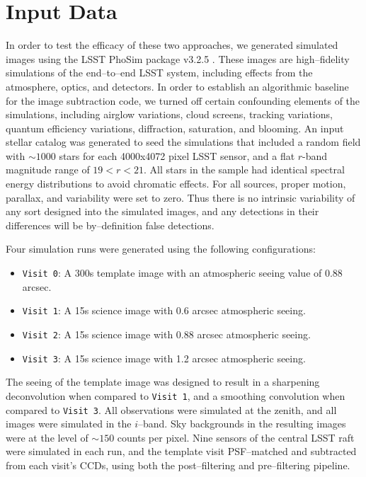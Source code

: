 \documentclass[iop]{emulateapj}
\begin{document}

\section{Input Data}

In order to test the efficacy of these two approaches, we generated simulated images using the LSST PhoSim package v3.2.5 \citep{phosim}.
These images are high--fidelity simulations of the end--to--end LSST system, including effects from the atmosphere, optics, and detectors.
In order to establish an algorithmic baseline for the image subtraction code, we turned off certain confounding elements of the simulations, including airglow variations, cloud screens, tracking variations, quantum efficiency variations, diffraction, saturation, and blooming.
An input stellar catalog was generated to seed the simulations that included a random field with $\sim 1000$ stars for each 4000x4072 pixel LSST sensor, and a flat $r$-band magnitude range of $19<r<21$.
All stars in the sample had identical spectral energy distributions to avoid chromatic effects.
For all sources, proper motion, parallax, and variability were set to zero.
Thus there is no intrinsic variability of any sort designed into the simulated images, and any detections in their differences will be by--definition false detections.

Four simulation runs were generated using the following configurations:
\begin{itemize}
\item {\tt Visit 0}: A 300s template image with an atmospheric seeing value of 0.88 arcsec.
\item {\tt Visit 1}: A 15s science image with 0.6 arcsec atmospheric seeing.
\item {\tt Visit 2}: A 15s science image with 0.88 arcsec atmospheric seeing.
\item {\tt Visit 3}: A 15s science image with 1.2 arcsec atmospheric seeing.
\end{itemize}
The seeing of the template image was designed to result in a sharpening deconvolution when compared to {\tt Visit 1}, and a smoothing convolution when compared to {\tt Visit 3}.
All observations were simulated at the zenith, and all images were simulated in the $i$--band.
Sky backgrounds in the resulting images were at the level of $\sim 150$ counts per pixel.
Nine sensors of the central LSST raft were simulated in each run, and the template visit PSF--matched and subtracted from each visit's CCDs, using both the post--filtering and pre--filtering pipeline.
\end{document}
